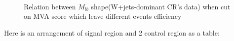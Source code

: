 		\FloatBarrier
		\begin{figure}[H]
		\centering
			\\
		\caption{Relation between $M_{lb}$ shape(W+jets-dominant CR's data) when cut on MVA score which leave different events efficiency}
		\label{EventSelReco:fig:CR_shape_MVAcut}
		\end{figure}
		\FloatBarrier

		Here is an arrangement of signal region and 2 control region as a table:

\FloatBarrier
